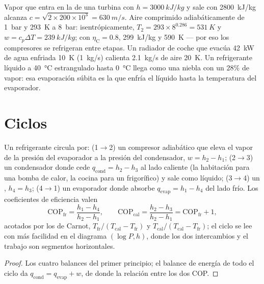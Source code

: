 \begin{example}\label{ex:b2:open-systems:numbers}
Vapor que entra en la  de una turbina con $h = \qty{3000}{kJ/kg}$ y sale
con \qty{2800}{kJ/kg} alcanza $c = \sqrt{2 \times 200 \times 10^3} =
\qty{630}{m/s}$. Aire comprimido adiabáticamente de \qty{1}{bar} y
\qty{293}{K} a \qty{8}{bar}: isentrópicamente, $T_2 = 293 \times 8^{0.286} =
\qty{531}{K}$ y $w = c_p\Delta T = \qty{239}{kJ/kg}$; con $\eta_{\text{C}} =
0.8$, \qty{299}{kJ/kg} y \qty{590}{K} --- por eso los compresores se
refrigeran entre etapas. Un radiador de coche que evacúa \qty{42}{kW} de agua
enfriada \qty{10}{K} (\qty{1}{kg/s}) calienta \qty{2.1}{kg/s} de aire
\qty{20}{K}. Un refrigerante líquido a \qty{40}{\celsius} estrangulado hasta
\qty{0}{\celsius} llega como una niebla con un $28\%$ de vapor: esa evaporación súbita
es la que enfría el líquido hasta la temperatura del evaporador.
\end{example}

\section{Ciclos}

\begin{proposition}\label{prop:b2:open-systems:fridge}
Un refrigerante circula por: (1$\to$2) un compresor adiabático
que eleva el vapor de la presión del evaporador a la presión del
condensador, $w = h_2 - h_1$; (2$\to$3) un condensador donde cede
$q_{\text{cond}} = h_2 - h_3$ al lado caliente (la habitación para una bomba de calor, la
cocina para un frigorífico) y sale como líquido; (3$\to$4) un , $h_4
= h_3$; (4$\to$1) un evaporador donde absorbe $q_{\text{evap}} = h_1 - h_4$
del lado frío. Los coeficientes de eficiencia valen
\[
\mathrm{COP}_{\text{fr}} = \frac{h_1 - h_4}{h_2 - h_1}, \qquad
\mathrm{COP}_{\text{cal}} = \frac{h_2 - h_3}{h_2 - h_1} = \mathrm{COP}_{\text{fr}} + 1 ,
\]
acotados por los de Carnot, $T_{\text{fr}}/(T_{\text{cal}} - T_{\text{fr}})$ y
$T_{\text{cal}}/(T_{\text{cal}} - T_{\text{fr}})$; el ciclo se lee con más facilidad en
el diagrama $(\log P, h)$, donde los dos intercambios y el trabajo son
segmentos horizontales.
\end{proposition}

\begin{proof}
Los cuatro balances del primer principio; el balance de energía de todo el ciclo
da $q_{\text{cond}} = q_{\text{evap}} + w$, de donde la relación entre
los dos COP.
\end{proof}

